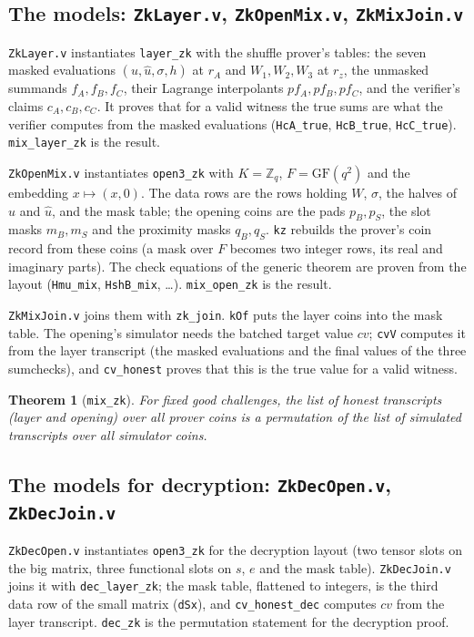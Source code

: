 \documentclass[11pt,a4paper]{article}
\newcommand{\Zq}{\mathbb{Z}_q}
\newcommand{\uh}{\hat{u}}
\theoremstyle{definition}
\theoremstyle{plain}
\newtheorem{theorem}[definition]{Theorem}
\begin{document}
\subsection{The models: \texttt{ZkLayer.v}, \texttt{ZkOpenMix.v}, \texttt{ZkMixJoin.v}}

\texttt{ZkLayer.v} instantiates \texttt{layer\_zk} with the shuffle prover's tables: the seven masked
evaluations $(u,\uh,\sigma,h)$ at $r_A$ and $W_1,W_2,W_3$ at $r_z$, the unmasked summands $f_A,f_B,f_C$,
their Lagrange interpolants $pf_A,pf_B,pf_C$, and the verifier's claims $c_A,c_B,c_C$. It proves that
for a valid witness the true sums are what the verifier computes from the masked evaluations
(\texttt{HcA\_true}, \texttt{HcB\_true}, \texttt{HcC\_true}). \texttt{mix\_layer\_zk} is the result.

\texttt{ZkOpenMix.v} instantiates \texttt{open3\_zk} with $K=\Zq$, $F=\mathrm{GF}(q^2)$ and the embedding
$x\mapsto(x,0)$. The data rows are the rows holding $W$, $\sigma$, the halves of $u$ and $\uh$, and the
mask table; the opening coins are the pads $p_B,p_S$, the slot masks $m_B,m_S$ and the proximity
masks $q_B,q_S$. \texttt{kz} rebuilds the prover's coin record from these coins (a mask over $F$
becomes two integer rows, its real and imaginary parts). The check equations of the generic
theorem are proven from the layout (\texttt{Hmu\_mix}, \texttt{HshB\_mix}, \dots). \texttt{mix\_open\_zk} is
the result.

\texttt{ZkMixJoin.v} joins them with \texttt{zk\_join}. \texttt{kOf} puts the layer coins into the mask
table. The opening's simulator needs the batched target value $cv$; \texttt{cvV} computes it from the
layer transcript (the masked evaluations and the final values of the three sumchecks), and
\texttt{cv\_honest} proves that this is the true value for a valid witness.
\begin{theorem}[\texttt{mix\_zk}]
For fixed good challenges, the list of honest transcripts (layer and opening) over all prover coins
is a permutation of the list of simulated transcripts over all simulator coins.
\end{theorem}

\subsection{The models for decryption: \texttt{ZkDecOpen.v}, \texttt{ZkDecJoin.v}}

\texttt{ZkDecOpen.v} instantiates \texttt{open3\_zk} for the decryption layout (two tensor slots on the
big matrix, three functional slots on $s$, $e$ and the mask table). \texttt{ZkDecJoin.v} joins it with
\texttt{dec\_layer\_zk}; the mask table, flattened to integers, is the third data row of the small
matrix (\texttt{dSx}), and \texttt{cv\_honest\_dec} computes $cv$ from the layer transcript.
\texttt{dec\_zk} is the permutation statement for the decryption proof.
\end{document}

